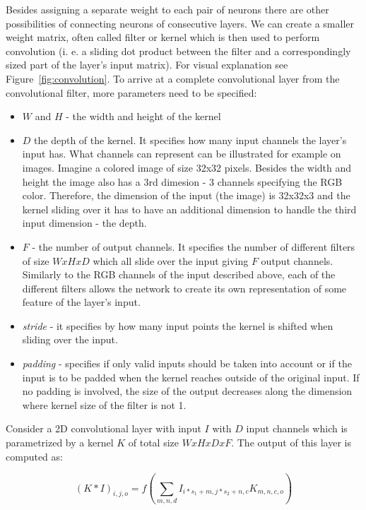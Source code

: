 Besides assigning a separate weight to each pair of neurons there are other possibilities of connecting neurons of consecutive layers.
We can create a smaller weight matrix, often called filter or kernel which is then used to perform convolution (i. e. a sliding dot product between the filter and a correspondingly sized part of the layer's input matrix). 
For visual explanation see Figure~\ref{fig:convolution}.
To arrive at a complete convolutional layer from the convolutional filter, more parameters need to be specified:
\begin{itemize}
    \item $W$  and $H$ - the width and height of the kernel
    \item $D$ the depth of the kernel. 
    It specifies how many input channels the layer's input has.
    What channels can represent can be illustrated for example on images.
    Imagine a colored image of size 32x32 pixels.
    Besides the width and height the image also has a 3rd dimesion - 3 channels specifying the RGB color.
    Therefore, the dimension of the input (the image) is 32x32x3 and the kernel sliding over it has to have an additional dimension to handle the third input dimension - the depth.
    \item $F$ - the number of output channels. 
    It specifies the number of different filters of size $WxHxD$ which all slide over the input giving $F$ output channels. 
    Similarly to the RGB channels of the input described above, each of the different filters allows the network to create its own representation of some feature of the layer's input.    
    \item \textit{stride} - it specifies by how many input points the kernel is shifted when sliding over the input. 
    \item \textit{padding} - specifies if only valid inputs should be taken into account or if the input is to be padded when the kernel reaches outside of the original input.
    If no padding is involved, the size of the output decreases along the dimension where kernel size of the filter is not 1.
\end{itemize}

Consider a 2D convolutional layer with input $I$ with $D$ input channels which is parametrized by a kernel $K$ of total size $WxHxDxF$. The output of this layer is computed as:

\begin{equation}
    (K * I)_{i,j,o} = f(\sum_{m,n,d} I_{i*s_1+m,j*s_2+n,c} K_{m,n,c,o})
    \label{eq:convolution}
\end{equation}


